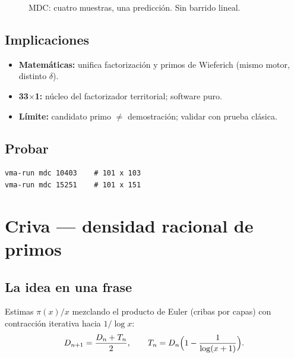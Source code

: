 \documentclass[11pt,a4paper,twoside]{book}
\begin{document}
\begin{figure}[htbp]
\centering
{}
\caption{MDC: cuatro muestras, una predicción. Sin barrido lineal.}
\end{figure}

\section{Implicaciones}
\begin{itemize}[noitemsep]
  \item \textbf{Matemáticas:} unifica factorización y primos de Wieferich (mismo motor, distinto $\delta$).
  \item \textbf{33$\times$1:} núcleo del factorizador territorial; software puro.
  \item \textbf{Límite:} candidato primo $\neq$ demostración; validar con prueba clásica.
\end{itemize}

\section{Probar}
\begin{lstlisting}
vma-run mdc 10403    # 101 x 103
vma-run mdc 15251    # 101 x 151
\end{lstlisting}

\chapter{Criva — densidad racional de primos}

\section{La idea en una frase}
Estimas $\pi(x)/x$ mezclando el producto de Euler (cribas por capas) con
contracción iterativa hacia $1/\log x$:
\[
  D_{n+1} = \frac{D_n + T_n}{2}, \qquad T_n = D_n\Bigl(1-\frac{1}{\log(x+1)}\Bigr).
\]
\end{document}
